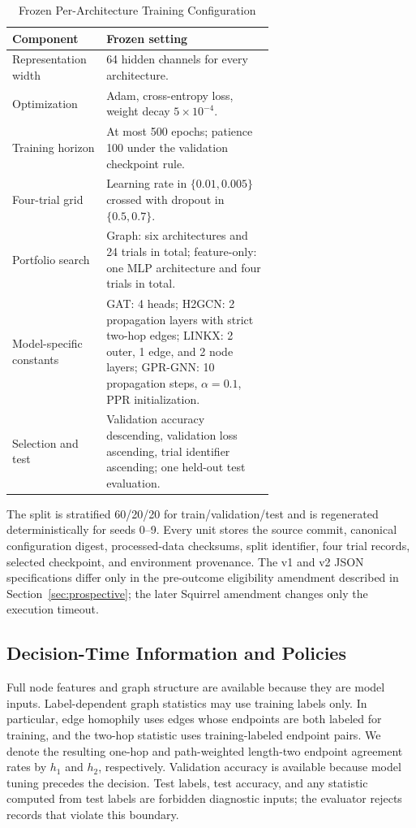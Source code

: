 \begin{table}[t]
\centering
\caption{Frozen Per-Architecture Training Configuration}
\label{tab:frozen_training}
\small
\begin{tabular}{@{}lp{0.64\linewidth}@{}}
\toprule
Component & Frozen setting \\
\midrule
Representation width & 64 hidden channels for every architecture. \\
Optimization & Adam, cross-entropy loss, weight decay $5\times 10^{-4}$. \\
Training horizon & At most 500 epochs; patience 100 under the validation checkpoint rule. \\
Four-trial grid & Learning rate in $\{0.01,0.005\}$ crossed with dropout in $\{0.5,0.7\}$. \\
Portfolio search & Graph: six architectures and 24 trials in total; feature-only: one MLP architecture and four trials in total. \\
Model-specific constants & GAT: 4 heads; H2GCN: 2 propagation layers with strict two-hop edges; LINKX: 2 outer, 1 edge, and 2 node layers; GPR-GNN: 10 propagation steps, $\alpha=0.1$, PPR initialization. \\
Selection and test & Validation accuracy descending, validation loss ascending, trial identifier ascending; one held-out test evaluation. \\
\bottomrule
\end{tabular}
\end{table}

The split is stratified 60/20/20 for train/validation/test and is regenerated deterministically for seeds 0--9. Every unit stores the source commit, canonical configuration digest, processed-data checksums, split identifier, four trial records, selected checkpoint, and environment provenance. The v1 and v2 JSON specifications differ only in the pre-outcome eligibility amendment described in Section~\ref{sec:prospective}; the later Squirrel amendment changes only the execution timeout.

\subsection{Decision-Time Information and Policies}

Full node features and graph structure are available because they are model inputs. Label-dependent graph statistics may use training labels only. In particular, edge homophily uses edges whose endpoints are both labeled for training, and the two-hop statistic uses training-labeled endpoint pairs. We denote the resulting one-hop and path-weighted length-two endpoint agreement rates by $h_1$ and $h_2$, respectively. Validation accuracy is available because model tuning precedes the decision. Test labels, test accuracy, and any statistic computed from test labels are forbidden diagnostic inputs; the evaluator rejects records that violate this boundary.

